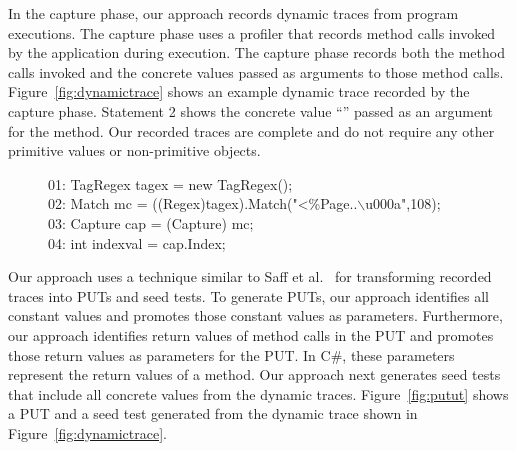 In the capture phase, our approach records dynamic traces from program executions. The capture phase uses a profiler that records method calls invoked by the application during execution. The capture phase records both the method calls invoked and the concrete values passed as arguments to those method calls. Figure~\ref{fig:dynamictrace} shows an example dynamic trace recorded by the capture phase. Statement 2 shows the concrete value ``'' passed as an argument for the  method. Our recorded traces are complete and do not require any other primitive values or non-primitive objects.

\begin{figure}[t]
\begin{CodeOut}
01: TagRegex tagex = new TagRegex();\\
02: Match mc = ((Regex)tagex).Match("<\%\@ Page..$\backslash$u000a",108);\\
03: Capture cap = (Capture) mc;\\
04: int indexval = cap.Index;\\
\end{CodeOut}\vspace*{-5ex}
\vspace*{-3ex}
\end{figure}

Our approach uses a technique similar to Saff et al.~\cite{david:java} for transforming recorded traces into PUTs and seed tests. To generate PUTs, our approach identifies all constant values and promotes those constant values as parameters. Furthermore, our approach identifies return values of method calls in the PUT and promotes those return values as  parameters for the PUT. In C\#, these  parameters represent the return values of a method. Our approach next generates seed tests that include all concrete values from the dynamic traces. Figure~\ref{fig:putut} shows a PUT and a seed test generated from the dynamic trace shown in Figure~\ref{fig:dynamictrace}.

